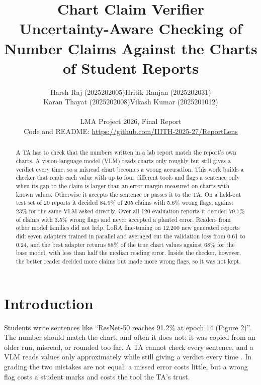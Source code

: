 \documentclass[11pt,a4paper]{article}
\title{\textbf{Chart Claim Verifier}\\[2pt]\large Uncertainty-Aware Checking of Number Claims Against the Charts of Student Reports}
\author{\begin{tabular}{ll}
Harsh Raj (2025202005) & \hspace{2em}Hritik Ranjan (2025202031) \\
Karan Thayat (2025202008) & \hspace{2em}Vikash Kumar (2025201012)\\ \end{tabular}\\ LMA Project 2026, Final Report\\ {\normalsize Code and README: \url{https://github.com/IIITH-2025-27/ReportLens}}}
\date{}
\begin{document}
\maketitle

\begin{abstract}
\noindent A TA has to check that the numbers written in a lab report match the report's own charts. A vision-language model (VLM) reads charts only roughly but still gives a verdict every time, so a misread chart becomes a wrong accusation. This work builds a checker that reads each value with up to four different tools and flags a sentence only when its gap to the claim is larger than an error margin measured on charts with known values. Otherwise it accepts the sentence or passes it to the TA. On a held-out test set of 20 reports it decided 84.9\% of 205 claims with 5.6\% wrong flags, against 23\% for the same VLM asked directly. Over all 120 evaluation reports it decided 79.7\% of claims with 3.5\% wrong flags and never accepted a planted error. Readers from other model families did not help. LoRA fine-tuning on 12{,}200 new generated reports did: seven adapters trained in parallel and averaged cut the validation loss from 0.61 to 0.24, and the best adapter returns 88\% of the true chart values against 68\% for the base model, with less than half the median reading error. Inside the checker, however, the better reader decided more claims but made more wrong flags, so it was not kept.
\end{abstract}

\section{Introduction}\label{sec:intro}

Students write sentences like ``ResNet-50 reaches 91.2\% at epoch 14 (Figure 2)''. The number should match the chart, and often it does not: it was copied from an older run, misread, or rounded too far. A TA cannot check every sentence, and a VLM reads values only approximately while still giving a verdict every time \cite{sciver,toolsciver}. In grading the two mistakes are not equal: a missed error costs little, but a wrong flag costs a student marks and costs the tool the TA's trust.
\end{document}
